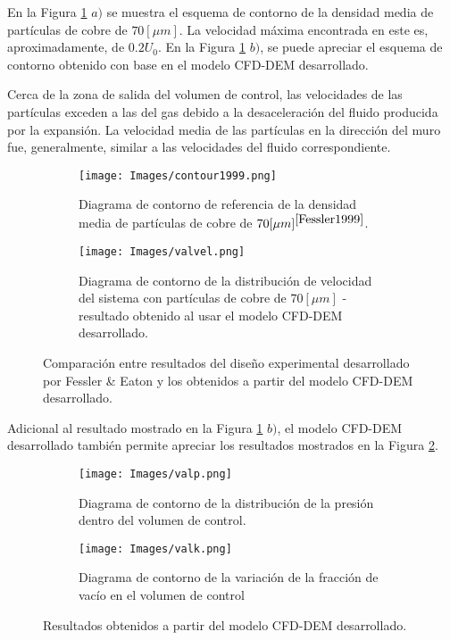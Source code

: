 \noindent
\justify

En la Figura \ref{resul1999} $a)$ se muestra el esquema de contorno de la densidad media de part\'iculas de cobre de $70 [\mu m]$. La velocidad m\'axima encontrada en este es, aproximadamente, de $0.2 U_0$. En la Figura \ref{resul1999} $b)$, se puede apreciar el esquema de contorno obtenido con base en el modelo CFD-DEM desarrollado.

\noindent
\justify

Cerca de la zona de salida del volumen de control, las velocidades de las part\'iculas exceden a las del gas debido a la desaceleraci\'on del fluido producida por la expansi\'on. La velocidad media de las part\'iculas en la direcci\'on del muro fue, generalmente, similar a las velocidades del fluido correspondiente.


\newpage

\begin{figure}[h!]
	\centering
	\begin{subfigure}[b]{\textwidth}
		\centering
		\texttt{[image: Images/contour1999.png]}
		\caption{Diagrama de contorno de referencia de la densidad media de part\'iculas de cobre de $70 [\mu m]^{\cite{Fessler1999}}$.}
	\end{subfigure}
	\hfill
	\begin{subfigure}[b]{\textwidth}
		\centering
		\texttt{[image: Images/valvel.png]}
		\caption{Diagrama de contorno de la distribuci\'on de velocidad del sistema con part\'iculas de cobre de $70 [\mu m]$ - resultado obtenido al usar el modelo CFD-DEM desarrollado.}
	\end{subfigure}
	\caption{Comparaci\'on entre resultados del dise\~no experimental desarrollado por Fessler \& Eaton y los obtenidos a partir del modelo CFD-DEM desarrollado.}
	\label{resul1999}
\end{figure}

\noindent
\justify

Adicional al resultado mostrado en la Figura \ref{resul1999} $b)$, el modelo CFD-DEM desarrollado tambi\'en permite apreciar los resultados mostrados en la Figura \ref{valrel}.

\begin{figure}[h!]
	\centering
	\begin{subfigure}[b]{\textwidth}
		\centering
		\texttt{[image: Images/valp.png]}
		\caption{Diagrama de contorno de la distribuci\'on de la presi\'on dentro del volumen de control.}
	\end{subfigure}
	\hfill
	\begin{subfigure}[b]{\textwidth}
		\centering
		\texttt{[image: Images/valk.png]}
		\caption{Diagrama de contorno de la variaci\'on de la fracci\'on de vac\'io en el volumen de control}
	\end{subfigure}
	\caption{Resultados obtenidos a partir del modelo CFD-DEM desarrollado.}
	\label{valrel}
\end{figure}

